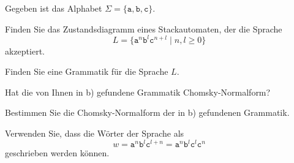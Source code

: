 Gegeben ist das Alphabet $\Sigma=\{\texttt{a},\texttt{b},\texttt{c}\}$.
\begin{teilaufgaben}
\item
Finden Sie das Zustandsdiagramm eines Stackautomaten, der die Sprache
\[
L
=
\{ \texttt{a}^n \texttt{b}^l \texttt{c}^{n+l}\;|\; n,l\ge 0\}
\]
akzeptiert.
\item
Finden Sie eine Grammatik für die Sprache $L$.
\item
Hat die von Ihnen in b) gefundene Grammatik Chomsky-Normalform?
\item 
Bestimmen Sie die Chomsky-Normalform der in b) gefundenen Grammatik.
\end{teilaufgaben}

\begin{hinweis}
Verwenden Sie, dass die Wörter der Sprache als
\[
w
=
\texttt{a}^n \texttt{b}^l \texttt{c}^{l+n}
=
\texttt{a}^n \texttt{b}^l \texttt{c}^{l} \texttt{c}^{n}
\]
geschrieben werden können.
\end{hinweis}

